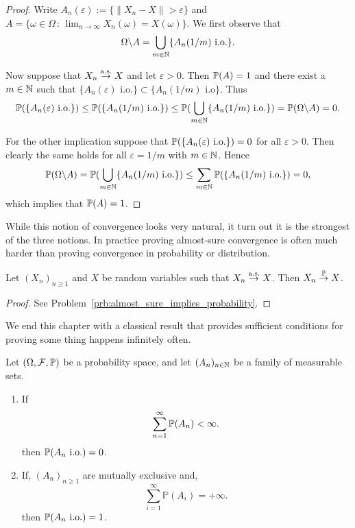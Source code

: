 \begin{proof}
Write $A_n(\varepsilon) :=  \{\|X_n - X\| > \varepsilon\}$ and $A = \{\omega \in \Omega \, : \, \lim_{n \to \infty} X_n(\omega) = X(\omega)\}$. We first observe that
\[
	\Omega\backslash A = \bigcup_{m \in \mathbb N} \{A_n(1/m) \text{ i.o.}\}.
\]

Now suppose that $X_n \stackrel{\mathrm{a.s.}}{\rightarrow} X$ and let $\varepsilon > 0$. Then $\mathbb P(A) = 1$ and there exist a $m \in \mathbb N$ such that $\{A_n(\varepsilon) \text{ i.o.}\} \subset \{A_n(1/m) \text{ i.o}\}$. Thus
\[
	\mathbb P(\{A_n(\varepsilon) \text{ i.o.}\}) \le \mathbb P(\{A_n(1/m) \text{ i.o.}\}) \le \mathbb P(\bigcup_{m \in \mathbb N} \{A_n(1/m) \text{ i.o.}\}) = \mathbb P(\Omega \backslash A) = 0.
\]

For the other implication suppose that $\mathbb P(\{A_n(\varepsilon) \text{ i.o.}\}) = 0$ for all $\varepsilon > 0$. Then clearly the same holds for all $\varepsilon = 1/m$ with $m \in \mathbb N$. Hence
\[
	\mathbb P(\Omega\backslash A) = \mathbb P(\bigcup_{m \in \mathbb N} \{A_n(1/m) \text{ i.o.}\}) \le \sum_{m \in \mathbb N} \mathbb P(\{A_n(1/m) \text{ i.o.}\}) = 0,
\]
which implies that $\mathbb P(A) = 1$.
\end{proof}

While this notion of convergence looks very natural, it turn out it is the strongest of the three notions. In practice proving almost-sure convergence is often much harder than proving convergence in probability or distribution.

\begin{lemma}\label{lem:almost_sure_implies_probability}
Let $(X_n)_{n \ge 1}$ and $X$ be random variables such that $X_n \stackrel{\mathrm{a.s.}}{\rightarrow} X$. Then $X_n \stackrel{\mathbb P}{\rightarrow} X$.
\end{lemma}

\begin{proof}
See Problem~\ref{prb:almost_sure_implies_probability}.
\end{proof}

We end this chapter with a classical result that provides sufficient conditions for proving some thing happens infinitely often.

\begin{lemma}\label{lem:borel_cantelli}
Let $(\Omega, \mathcal{F}, \mathbb P)$ be a probability space, and let $(A_n)_{n\in\mathbb N}$ be a family of measurable sets.
\begin{enumerate}[label={(\alph*)}]
\item If
\[
	\sum_{n=1}^\infty \mathbb P(A_n) < \infty.
\]
then $\mathbb P(A_n \text{ i.o.}) = 0$.
\item If, $(A_n)_{n \ge 1}$ are mutually exclusive and,
\[
	\sum_{i=1}^\infty \mathbb{P}(A_i) = +\infty.
\]
then $\mathbb P(A_n \text{ i.o.}) = 1$.
\end{enumerate}
\end{lemma}

